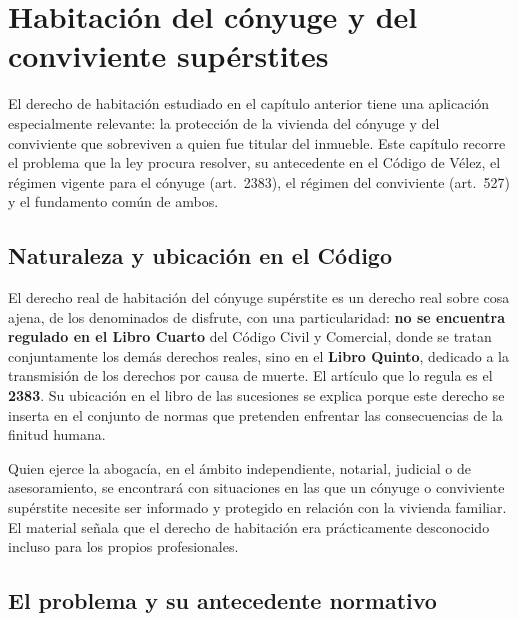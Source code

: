 \documentclass[12pt,oneside]{book}
\begin{document}
\chapter{Habitación del cónyuge y del conviviente supérstites}\label{cap:habsuperstite}

El derecho de habitación estudiado en el capítulo anterior tiene una aplicación especialmente relevante: la protección de la vivienda del cónyuge y del conviviente que sobreviven a quien fue titular del inmueble. Este capítulo recorre el problema que la ley procura resolver, su antecedente en el Código de Vélez, el régimen vigente para el cónyuge (art.~2383), el régimen del conviviente (art.~527) y el fundamento común de ambos.

\section{Naturaleza y ubicación en el Código}

El derecho real de habitación del cónyuge supérstite es un derecho real sobre cosa ajena, de los denominados de disfrute, con una particularidad: \textbf{no se encuentra regulado en el Libro Cuarto} del Código Civil y Comercial, donde se tratan conjuntamente los demás derechos reales, sino en el \textbf{Libro Quinto}, dedicado a la transmisión de los derechos por causa de muerte. El artículo que lo regula es el \textbf{2383}. Su ubicación en el libro de las sucesiones se explica porque este derecho se inserta en el conjunto de normas que pretenden enfrentar las consecuencias de la finitud humana.

\begin{note}
Quien ejerce la abogacía, en el ámbito independiente, notarial, judicial o de asesoramiento, se encontrará con situaciones en las que un cónyuge o conviviente supérstite necesite ser informado y protegido en relación con la vivienda familiar. El material señala que el derecho de habitación era prácticamente desconocido incluso para los propios profesionales.
\end{note}

\section{El problema y su antecedente normativo}
\end{document}
